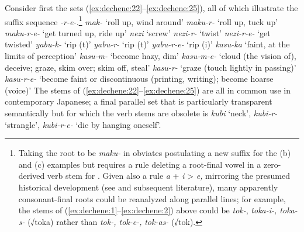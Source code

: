 \documentclass[output=paper,
modfonts
]{LSP/langsci}
\begin{document}
Consider first the  sets (\ref{ex:dechene:22}--\ref{ex:dechene:25}), all of which illustrate
the suffix sequence \textit{-r-e-.}\footnote{Taking the root to be
  \textit{maku-} in  obviates postulating a new suffix  for
  the (b) and (c) examples but requires a rule deleting a root-final vowel
  in a zero-derived verb stem for . Given also a rule \textit{a} +
  \textit{i} \textgreater{} \textit{e,} mirroring the presumed historical
  development (see \citealt{ono1953a}  and subsequent literature), many apparently
  consonant-final roots could be reanalyzed along parallel lines; for
  example, the stems of (\ref{ex:dechene:1}--\ref{ex:dechene:2}) above could be \textit{tok-},
  \textit{toka-i-, toka-s-} (√toka) rather than \textit{tok-, tok-e-,}
  \textit{tok-as-} (√tok).}
\ea \label{ex:dechene:22}
	 \ea \label{ex:dechene:22a} \textit{mak-} `roll up, wind around'
	 \ex \label{ex:dechene:22b} \textit{maku-r-} `roll up, tuck up'
	 \ex \label{ex:dechene:22c} \textit{maku-r-e-} `get turned up, ride up'
	\z
\ex \label{ex:dechene:23} 
	 \ea \label{ex:dechene:23a} \textit{nezi} `screw'
	 \ex \label{ex:dechene:23b} \textit{nezi-r-} `twist'
	 \ex \label{ex:dechene:23c} \textit{nezi-r-e-} `get twisted'
	\z
\ex \label{ex:dechene:24}  
	 \ea \label{ex:dechene:24a} \textit{yabu-k-} `rip (t)'
	 \ex \label{ex:dechene:24b} \textit{yabu-r-} `rip (t)'
	 \ex \label{ex:dechene:24c} \textit{yabu-r-e-} `rip (i)'
	\z
\ex \label{ex:dechene:25} 
	 \ea \label{ex:dechene:25a} \textit{kasu-ka} `faint, at the limits of perception'
	 \ex \label{ex:dechene:25b} \textit{kasu-m-} `become hazy, dim'
	 \ex \label{ex:dechene:25c} \textit{kasu-m-e-} `cloud (the vision of), deceive; graze, skim over; skim off, steal'
	 \ex \label{ex:dechene:25d} \textit{kasu-r-} `graze (touch lightly in passing)'
	 \ex \label{ex:dechene:25e} \textit{kasu-r-e-} `become faint or discontinuous (printing, writing); become hoarse (voice)'
	\z
\z
The stems of (\ref{ex:dechene:22}--\ref{ex:dechene:25}) are all in common use in contemporary Japanese; a
final parallel set that is particularly transparent semantically but for
which the verb stems are obsolete is \textit{kubi} `neck', \textit{kubi-r-}
`strangle', \textit{kubi-r-e-} `die by hanging oneself'.
\end{document}
